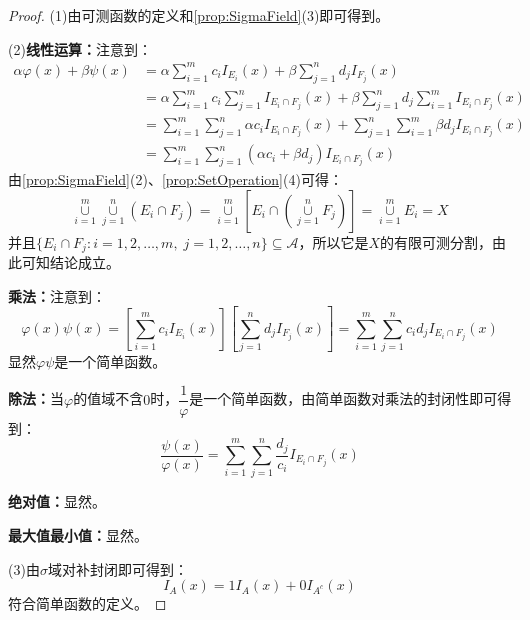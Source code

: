 \begin{proof}
	(1)由可测函数的定义和\cref{prop:SigmaField}(3)即可得到。\par
	(2)\textbf{线性运算：}注意到：
	\begin{align*}
		\alpha\varphi(x)+\beta\psi(x)
		&=\alpha\sum_{i=1}^{m}c_iI_{E_i}(x)+\beta\sum_{j=1}^{n}d_jI_{F_j}(x) \\
		&=\alpha\sum_{i=1}^{m}c_i\sum_{j=1}^{n}I_{E_i\cap F_j}(x)+\beta\sum_{j=1}^{n}d_j\sum_{i=1}^{m}I_{E_i\cap F_j}(x) \\
		&=\sum_{i=1}^{m}\sum_{j=1}^{n}\alpha c_iI_{E_i\cap F_j}(x)+\sum_{j=1}^{n}\sum_{i=1}^{m}\beta d_jI_{E_i\cap F_j}(x) \\
		&=\sum_{i=1}^{m}\sum_{j=1}^{n}(\alpha c_i+\beta d_j)I_{E_i\cap F_j}(x)
	\end{align*}
	由\cref{prop:SigmaField}(2)、\cref{prop:SetOperation}(4)可得：
	\begin{equation*}
		\underset{i=1}{\overset{m}{\cup}}\underset{j=1}{\overset{n}{\cup}}(E_i\cap F_j)=\underset{i=1}{\overset{m}{\cup}}\left[E_i\cap\left(\underset{j=1}{\overset{n}{\cup}}F_j\right)\right]=\underset{i=1}{\overset{m}{\cup}}E_i=X
	\end{equation*}
	并且$\{E_i\cap F_j:i=1,2,\dots,m,\;j=1,2,\dots,n\}\subseteq\mathscr{A}$，所以它是$X$的有限可测分割，由此可知结论成立。\par
	\textbf{乘法：}注意到：
	\begin{equation*}
		\varphi(x)\psi(x)=\left[\sum_{i=1}^{m}c_iI_{E_i}(x)\right]\left[\sum_{j=1}^{n}d_jI_{F_j}(x)\right]=\sum_{i=1}^{m}\sum_{j=1}^{n}c_id_jI_{E_i\cap F_j}(x)
	\end{equation*}
	显然$\varphi\psi$是一个简单函数。\par
	\textbf{除法：}当$\varphi$的值域不含$0$时，$\dfrac{1}{\varphi}$是一个简单函数，由简单函数对乘法的封闭性即可得到：
	\begin{equation*}
		\frac{\psi(x)}{\varphi(x)}=\sum_{i=1}^{m}\sum_{j=1}^{n}\frac{d_j}{c_i}I_{E_i\cap F_j}(x)
	\end{equation*}\par
	\textbf{绝对值：}显然。\par
	\textbf{最大值最小值：}显然。\par
	(3)由$\sigma$域对补封闭即可得到：
	\begin{equation*}
		I_A(x)=1I_A(x)+0I_{A^c}(x)
	\end{equation*}
	符合简单函数的定义。
\end{proof}

